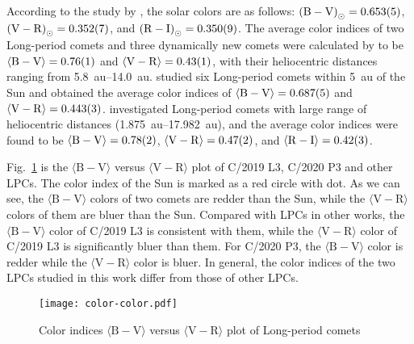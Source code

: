 According to the study by \cite{ramirez_ubvric_2012}, the solar colors are as follows: 
${(\mathrm{B} - \mathrm{V})}_{\odot} = \num{0.653 +- 0.005}$, 
${(\mathrm{V} - \mathrm{R})}_{\odot} = \num{0.352 +- 0.007}$, and 
${(\mathrm{R} - \mathrm{I})}_{\odot} = \num{0.350 +- 0.009}$. 
The average color indices of two Long-period comets and three dynamically new comets were calculated by \cite{meech_activity_2009} to be 
$\langle \mathrm{B} - \mathrm{V} \rangle = \num{0.76 +- 0.01}$ and 
$\langle \mathrm{V} - \mathrm{R} \rangle = \num{0.43 +- 0.01}$, 
with their heliocentric distances ranging from \SIrange{5.8}{14.0}{\astronomicalunit}. 
\cite{solontoi_ensemble_2012} studied six Long-period comets within \SI{5}{\astronomicalunit} of the Sun and obtained the average color indices of 
$\langle \mathrm{B} - \mathrm{V} \rangle = \num{0.687 +- 0.005}$ and 
$\langle \mathrm{V} - \mathrm{R} \rangle = \num{0.443 +- 0.003}$. 
\cite{jewittCOLORSYSTEMATICSCOMETS2015} investigated Long-period comets with large range of heliocentric distances (\SIrange{1.875}{17.982}{\astronomicalunit}), and the average color indices were found to be 
$\langle \mathrm{B} - \mathrm{V} \rangle = \num{0.78 +- 0.02}$, 
$\langle \mathrm{V} - \mathrm{R} \rangle = \num{0.47 +- 0.02}$, and 
$\langle \mathrm{R} - \mathrm{I} \rangle = \num{0.42 +- 0.03}$. 


Fig.~\ref{fig:color-color} is the $\langle \mathrm{B}-\mathrm{V} \rangle$ versus $\langle \mathrm{V}-\mathrm{R} \rangle$ plot of C/2019 L3, C/2020 P3 and other LPCs. 
The color index of the Sun \citep{ramirez_ubvric_2012} is marked as a red circle with dot. 
As we can see, the $\langle \mathrm{B} - \mathrm{V} \rangle$ colors of two comets are redder than the Sun, while the $\langle \mathrm{V} - \mathrm{R} \rangle$ colors of them are bluer than the Sun. 
Compared with LPCs in other works, the $\langle \mathrm{B} - \mathrm{V} \rangle$ color of C/2019 L3 is consistent with them, while the $\langle \mathrm{V} - \mathrm{R} \rangle$ color of C/2019 L3 is significantly bluer than them. For C/2020 P3, the $\langle \mathrm{B} - \mathrm{V} \rangle$ color is redder while the $\langle \mathrm{V} - \mathrm{R} \rangle$ color is bluer. 
In general, the color indices of the two LPCs studied in this work differ from those of other LPCs. 



\begin{figure}
    \centering
    \texttt{[image: color-color.pdf]}
    \caption{Color indices $\langle \mathrm{B-V} \rangle$ versus $\langle \mathrm{V-R} \rangle$ plot of Long-period comets}\label{fig:color-color}
\end{figure}

